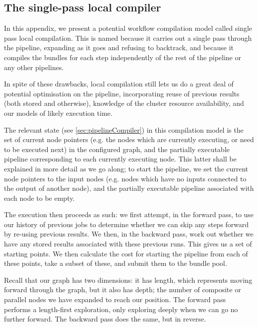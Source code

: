 \documentclass[10pt,a4paper]{article}
\newcommand{\npar}{\par\noindent\space}
\begin{document}
\begin{appendices}

\section{The single-pass local compiler}
\label{app:localCompiler}
\npar In this appendix, we present a potential workflow compilation model called single pass local compilation. This is named because it carries out a single pass through the pipeline, expanding as it goes and refusing to backtrack, and because it compiles the bundles for each step independently of the rest of the pipeline or any other pipelines.
\npar In spite of these drawbacks, local compilation still lets us do a great deal of potential optimisation on the pipeline, incorporating reuse of previous results (both stored and otherwise), knowledge of the cluster resource availability, and our models of likely execution time.
\npar The relevant state (see \ref{sec:pipelineCompiler}) in this compilation model is the set of current node pointers (e.g. the nodes which are currently executing, or need to be executed next) in the configured graph, and the partially executable pipeline corresponding to each currently executing node. This latter shall be explained in more detail as we go along; to start the pipeline, we set the current node pointers to the input nodes (e.g. nodes which have no inputs connected to the output of another node), and the partially executable pipeline associated with each node to be empty.
\npar The execution then proceeds as such: we first attempt, in the forward pass, to use our history of previous jobs to determine whether we can skip any steps forward by re-using previous results. We then, in the backward pass, work out whether we have any stored results associated with these previous runs. This gives us a set of starting points. We then calculate the cost for starting the pipeline from each of these points, take a subset of these, and submit them to the bundle pool.
\npar Recall that our graph has two dimensions: it has length, which represents moving forward through the graph, but it also has depth; the number of composite or parallel nodes we have expanded to reach our position. The forward pass performs a length-first exploration, only exploring deeply when we can go no further forward. The backward pass does the same, but in reverse.

\end{appendices}
\end{document}
